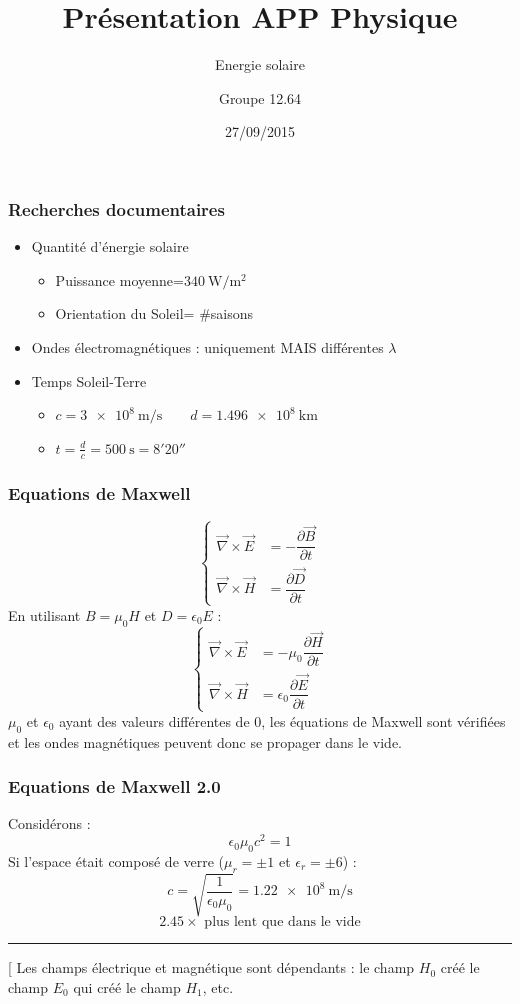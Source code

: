 \documentclass{beamer}
\begin{document}
\title[Présentation]{Présentation APP Physique}

\subtitle[\ldots]{Energie solaire}
\author{Groupe 12.64}
\date{27/09/2015}
\maketitle

\begin{frame}
\frametitle{Recherches documentaires}
\begin{itemize}
\item Quantité d'énergie solaire \begin{itemize}
	\item Puissance moyenne=$\SI{340}{\watt\per\meter^2}$
	\item Orientation du Soleil= \#saisons
	\end{itemize}
\item Ondes électromagnétiques : uniquement MAIS différentes $\lambda$
\item Temps Soleil-Terre \begin{itemize}
	\item $c=\SI{3e8}{\meter\per\second} \qquad d=\SI{1.496e8}{\kilo\meter}$
	\item $t=\frac{d}{c}=\SI{500}{\second}=8'20''$
	\end{itemize}
\end{itemize}
\end{frame} 

\begin{frame}
	\frametitle{Equations de Maxwell}
	$$\begin{cases}
			\vec{\nabla} \times \vec{E} &= - \dfrac{\partial{\vec{B}}}{\partial{t}} \\
			\vec{\nabla} \times \vec{H} &= \dfrac{\partial{\vec{D}}}{\partial{t}}
		\end{cases}$$
	En utilisant $B = \mu_0H$ et $D = \epsilon_0E$ :
	$$\begin{cases}
			\vec{\nabla} \times \vec{E} &= - \mu_0\dfrac{\partial{\vec{H}}}{\partial{t}} \\
			\vec{\nabla} \times \vec{H} &= \epsilon_0\dfrac{\partial{\vec{E}}}{\partial{t}}
		\end{cases}$$
		$\mu_0$ et $\epsilon_0$ ayant des valeurs différentes de $0$, les équations de Maxwell sont vérifiées et les ondes magnétiques peuvent donc se propager dans le vide.
\end{frame}

\begin{frame}
	\frametitle{Equations de Maxwell 2.0}
	Considérons : 
	$$\epsilon_0 \mu_0 c^2 = 1$$
	Si l'espace était composé de verre ($\mu_r = \pm1$ et $\epsilon_r = \pm6$) : 
	$$ c = \sqrt{\frac{1}{\epsilon_0 \mu_0}} = \SI{1.22e8}{\meter\per\second} $$
	$$ 2.45\times\text{ plus lent que dans le vide}$$
	\hrule
	\phantom[
	Les champs électrique et magnétique sont dépendants : le champ $H_0$ créé le champ $E_0$ qui créé le champ $H_1$, etc.
\end{frame}
\end{document}
